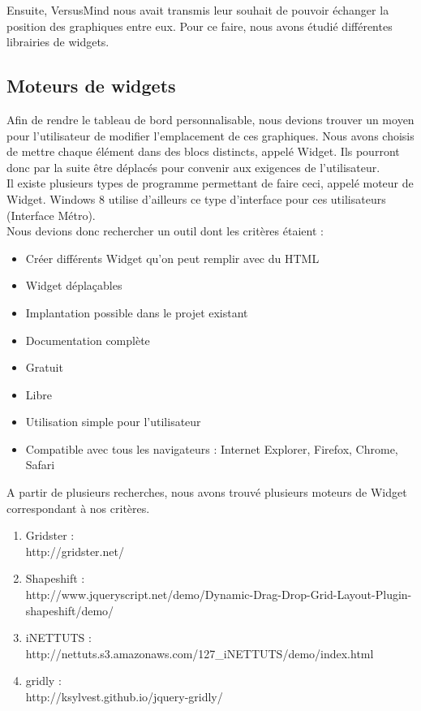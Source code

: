 \documentclass[12pt]{report}
\begin{document}
Ensuite, VersusMind nous avait transmis leur souhait de pouvoir échanger la position des graphiques entre eux. Pour ce faire, nous avons étudié différentes librairies de widgets.\\

		\subsection{Moteurs de widgets}
		
Afin de rendre le tableau de bord personnalisable, nous devions trouver un moyen pour l’utilisateur de modifier l’emplacement de ces graphiques. Nous avons choisis de mettre chaque élément dans des blocs distincts, appelé Widget. Ils pourront donc par la suite être déplacés pour convenir aux exigences de l’utilisateur.\\

Il existe plusieurs types de programme permettant de faire ceci, appelé moteur de Widget. Windows 8 utilise d’ailleurs ce type d’interface pour ces utilisateurs (Interface Métro).\\

Nous devions donc rechercher un outil dont les critères étaient :
\begin{itemize}
	\item Créer différents Widget qu’on peut remplir avec du HTML
	\item Widget déplaçables
	\item Implantation possible dans le projet existant
	\item Documentation complète
	\item Gratuit
	\item Libre
	\item Utilisation simple pour l’utilisateur
	\item Compatible avec tous les navigateurs : Internet Explorer, Firefox, Chrome, Safari
\end{itemize}

A partir de plusieurs recherches, nous avons trouvé plusieurs moteurs de Widget correspondant à nos critères.
\begin{enumerate}
\item Gridster : \\http://gridster.net/ 
\item Shapeshift : \\http://www.jqueryscript.net/demo/Dynamic-Drag-Drop-Grid-Layout-Plugin-shapeshift/demo/
\item iNETTUTS : \\http://nettuts.s3.amazonaws.com/127\_iNETTUTS/demo/index.html
\item gridly : \\http://ksylvest.github.io/jquery-gridly/
\end{enumerate}
	
\end{document}
